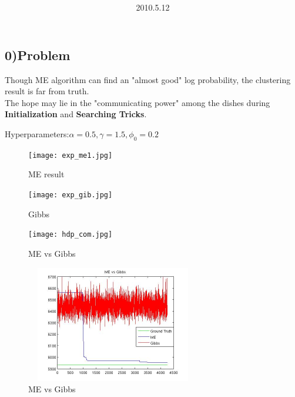 \documentclass{article}
\title{\vspace{0.3in}\textmd{\textbf{\hmwkTitle}}}
\date{2010.5.12}
\author{\textbf{\hmwkAuthorName}}
\begin{document}
\begin{spacing}{1.1}
\maketitle

\section{0)Problem}
Though ME algorithm can find an "almost good" log probability, the clustering result is far from truth. \\
The hope may lie in the "communicating power" among the dishes during {\bf Initialization} and {\bf Searching Tricks}.

Hyperparameters:$\alpha=0.5,\gamma=1.5,\phi_{0}=0.2$\\
\begin{figure}[h] 
  \begin{minipage}[b]{0.5\textwidth} 
    \centering 
    \texttt{[image: exp\_me1.jpg]} 
    \caption{ME result} 
    \label{fig:by:table} 
  \end{minipage}%
  \begin{minipage}[b]{0.5\textwidth} 
    \centering 
    \texttt{[image: exp\_gib.jpg]} 
    \caption{Gibbs}
    \label{fig:by:table}  
   \end{minipage}%
\end{figure}

\begin{figure}[h] 
  \begin{minipage}[b]{0.5\textwidth} 
    \centering 
    \texttt{[image: hdp\_com.jpg]} 
    \caption{ME vs Gibbs} 
    \label{fig:by:table} 
  \end{minipage}%
  \begin{minipage}[b]{0.5\textwidth} 
    \centering 
    \includegraphics[width=3in,height=2in]{hdp_com2.jpg} 
    \caption{ME vs Gibbs}
    \label{fig:by:table}  
   \end{minipage}%
\end{figure}


\end{spacing}
\end{document}
